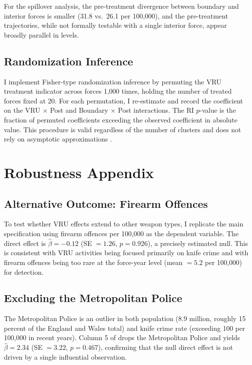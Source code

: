 \documentclass[12pt]{article}
\begin{document}
For the spillover analysis, the pre-treatment divergence between boundary and interior forces is smaller (31.8 vs.\ 26.1 per 100,000), and the pre-treatment trajectories, while not formally testable with a single interior force, appear broadly parallel in levels.

\subsection{Randomization Inference}

I implement Fisher-type randomization inference by permuting the VRU treatment indicator across forces 1,000 times, holding the number of treated forces fixed at 20. For each permutation, I re-estimate  and record the coefficient on the VRU $\times$ Post and Boundary $\times$ Post interactions. The RI $p$-value is the fraction of permuted coefficients exceeding the observed coefficient in absolute value. This procedure is valid regardless of the number of clusters and does not rely on asymptotic approximations \citep{young2019channeling}.

\section{Robustness Appendix}
\label{app:robustness}

\subsection{Alternative Outcome: Firearm Offences}

To test whether VRU effects extend to other weapon types, I replicate the main specification using firearm offences per 100,000 as the dependent variable. The direct effect is $\hat\beta = -0.12$ (SE $= 1.26$, $p = 0.926$), a precisely estimated null. This is consistent with VRU activities being focused primarily on knife crime and with firearm offences being too rare at the force-year level (mean $= 5.2$ per 100,000) for detection.

\subsection{Excluding the Metropolitan Police}

The Metropolitan Police is an outlier in both population (8.9 million, roughly 15 percent of the England and Wales total) and knife crime rate (exceeding 100 per 100,000 in recent years). Column 5 of  drops the Metropolitan Police and yields $\hat\beta = 2.34$ (SE $= 3.22$, $p = 0.467$), confirming that the null direct effect is not driven by a single influential observation.
\end{document}
